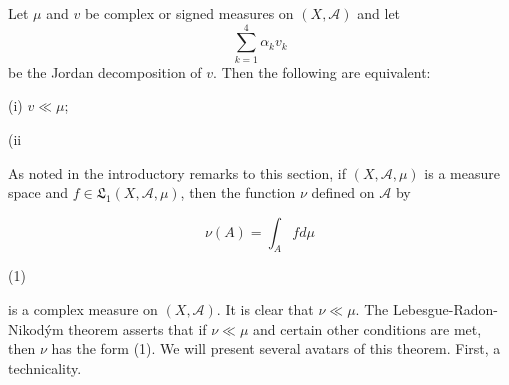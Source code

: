 Let $\mu$ and $v$ be complex or signed measures on $(X, \mathcal{A})$ and let $$\sum_{k=1}^{4} \alpha_k v_k$$ be the Jordan decomposition of $v$. Then the following are equivalent:

(i) $v \ll \mu$;

(ii

As noted in the introductory remarks to this section, if $(X, \mathcal{A}, \mu)$ is a measure space and $f \in \mathfrak{L}_1(X, \mathcal{A}, \mu)$, then the function $\nu$ defined on $\mathcal{A}$ by

$$\nu(A) = \int_A f d\mu$$

(1)

is a complex measure on $(X, \mathcal{A})$. It is clear that $\nu \ll \mu$. The Lebesgue-Radon-Nikodým theorem asserts that if $\nu \ll \mu$ and certain other conditions are met, then $\nu$ has the form (1). We will present several avatars of this theorem. First, a technicality.